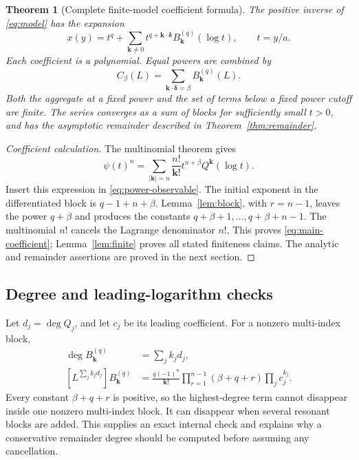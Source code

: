 \documentclass[11pt,a4paper]{article}
\numberwithin{equation}{section}
\newtheorem{theorem}{Theorem}[section]
\theoremstyle{definition}
\newcommand{\kk}{\boldsymbol k}
\newcommand{\deltaa}{\boldsymbol\delta}
\newcommand{\degree}{\operatorname{deg}}
\begin{document}
\begin{theorem}[Complete finite-model coefficient formula]\label{thm:coefficients}
The positive inverse of \eqref{eq:model} has the expansion
\begin{equation}\label{eq:full-series}
 \boxed{\displaystyle
 x(y)=t^q+\sum_{\kk\ne0}t^{q+\kk\cdot\deltaa}
                B_{\kk}^{(q)}(\log t),\qquad t=y/a.}
\end{equation}
Each coefficient is a polynomial. Equal powers are combined by
\begin{equation}\label{eq:aggregate}
 C_\beta(L)=\sum_{\kk\cdot\deltaa=\beta}B_{\kk}^{(q)}(L).
\end{equation}
Both the aggregate at a fixed power and the set of terms below a fixed
power cutoff are finite. The series converges as a sum of blocks for
sufficiently small $t>0$, and has the asymptotic remainder described in
Theorem~\ref{thm:remainder}.
\end{theorem}
\begin{proof}[Coefficient calculation]
The multinomial theorem gives
\[
 \psi(t)^n=\sum_{|\kk|=n}\frac{n!}{\kk!}
           t^{n+\beta}Q^{\kk}(\log t).
\]
Insert this expression in \eqref{eq:power-observable}. The initial
exponent in the differentiated block is $q-1+n+\beta$.
Lemma~\ref{lem:block}, with $r=n-1$, leaves the power $q+\beta$ and
produces the constants $q+\beta+1,\ldots,q+\beta+n-1$.
The multinomial $n!$ cancels the Lagrange denominator $n!$.
This proves \eqref{eq:main-coefficient}; Lemma~\ref{lem:finite} proves
all stated finiteness claims. The analytic and remainder assertions are
proved in the next section.
\end{proof}

\subsection{Degree and leading-logarithm checks}
Let $d_j=\degree Q_j$, and let $c_j$ be its leading coefficient.
For a nonzero multi-index block,
\begin{align}
 \degree B_{\kk}^{(q)}&=\sum_jk_jd_j,\label{eq:degree}\\
 [L^{\sum_jk_jd_j}]B_{\kk}^{(q)}
 &=\frac{q(-1)^n}{\kk!}
   \prod_{r=1}^{n-1}(\beta+q+r)\prod_jc_j^{k_j}.
 \label{eq:leading-log}
\end{align}
Every constant $\beta+q+r$ is positive, so the highest-degree term
cannot disappear inside one nonzero multi-index block. It can disappear
when several resonant blocks are added. This supplies an exact internal
check and explains why a conservative remainder degree should be computed
before assuming any cancellation.
\end{document}

